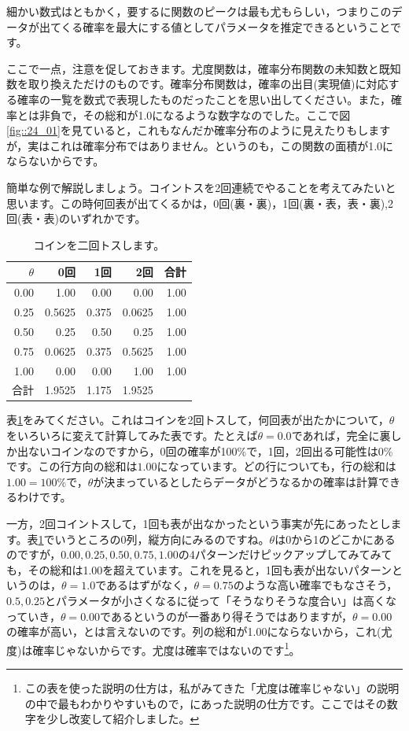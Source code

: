 \documentclass{ltjsbook}
\begin{document}
細かい数式はともかく，要するに関数のピークは最も尤もらしい，つまりこのデータが出てくる確率を最大にする値としてパラメータを推定できるということです。

ここで一点，注意を促しておきます。尤度関数は，確率分布関数の未知数と既知数を取り換えただけのものです。確率分布関数は，確率の出目(実現値)に対応する確率の一覧を数式で表現したものだったことを思い出してください。また，確率とは非負で，その総和が1.0になるような数字なのでした。ここで図\ref{fig::24_01}を見ていると，これもなんだか確率分布のように見えたりもしますが，実はこれは確率分布ではありません。というのも，この関数の面積が1.0にならないからです。

簡単な例で解説しましょう。コイントスを2回連続でやることを考えてみたいと思います。この時何回表が出てくるかは，0回(裏・裏)，1回(裏・表，表・裏),2回(表・表)のいずれかです。

\begin{table}[ht]
	\centering
	\caption{コインを二回トスします。}
	\begin{tabular}{rrrrr}
		\hline
		$\theta$ & 0回     & 1回    & 2回     & 合計   \\
		\hline
		0.00     & 1.00   & 0.00  & 0.00   & 1.00 \\
		0.25     & 0.5625 & 0.375 & 0.0625 & 1.00 \\
		0.50     & 0.25   & 0.50  & 0.25   & 1.00 \\
		0.75     & 0.0625 & 0.375 & 0.5625 & 1.00 \\
		1.00     & 0.00   & 0.00  & 1.00   & 1.00 \\
		\hline
		合計       & 1.9525 & 1.175 & 1.9525 &      \\
		\hline
	\end{tabular}
	\label{tbl::24_01}
\end{table}

表\ref{tbl::24_01}をみてください。これはコインを2回トスして，何回表が出たかについて，$\theta$をいろいろに変えて計算してみた表です。たとえば$\theta=0.0$であれば，完全に裏しか出ないコインなのですから，0回の確率が100\%で，1回，2回出る可能性は0\%です。この行方向の総和は$1.00$になっています。どの行についても，行の総和は$1.00=100\%$で，$\theta$が決まっているとしたらデータがどうなるかの確率は計算できるわけです。

一方，2回コイントスして，1回も表が出なかったという事実が先にあったとします。表\ref{tbl::24_01}でいうところの0列，縦方向にみるのですね。$\theta$は0から1のどこかにあるのですが，$0.00,0.25,0.50,0.75,1.00$の4パターンだけピックアップしてみてみても，その総和は1.00を超えています。これを見ると，1回も表が出ないパターンというのは，$\theta=1.0$であるはずがなく，$\theta=0.75$のような高い確率でもなさそう，$0.5,0.25$とパラメータが小さくなるに従って「そうなりそうな度合い」は高くなっていき，$\theta=0.00$であるというのが一番あり得そうではありますが，$\theta=0.00$の確率が高い，とは言えないのです。列の総和が1.00にならないから，これ(尤度)は確率じゃないからです。尤度は確率ではないのです\footnote{この表を使った説明の仕方は，私がみてきた「尤度は確率じゃない」の説明の中で最もわかりやすいもので，\citet{lambert2018student}にあった説明の仕方です。ここではその数字を少し改変して紹介しました。}。
\end{document}
